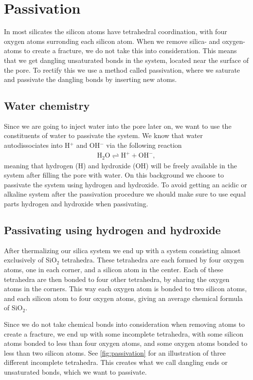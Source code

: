 \section{Passivation}
In most silicates the silicon atoms have tetrahedral coordination, with four oxygen atoms surronding each silicon atom. When we remove silica- and oxygen-atoms to create a fracture, we do not take this into consideration. This means that we get dangling unsaturated bonds in the system, located near the surface of the pore. To rectify this we use a method called passivation, where we saturate and passivate the dangling bonds by inserting new atoms. 

\subsection{Water chemistry}
Since we are going to inject water into the pore later on, we want to use the constituents of water to passivate the system. We know that water autodissociates into H$^{+}$ and OH$^{-}$ via the following reaction
\begin{align*}
    \text{H}_2\text{O} \rightleftharpoons \text{H}^{+} + \text{OH}^{-},
\end{align*}
meaning that hydrogen (H) and hydroxide (OH) will be freely available in the system after filling the pore with water. On this background we choose to passivate the system using hydrogen and hydroxide. To avoid getting an acidic or alkaline system after the passivation procedure we should make sure to use equal parts hydrogen and hydroxide when passivating.

\subsection{Passivating using hydrogen and hydroxide}
After thermalizing our silica system we end up with a system consisting almost exclusively of SiO$_2$ tetrahedra. These tetrahedra are each formed by four oxygen atoms, one in each corner, and a silicon atom in the center. Each of these tetrahedra are then bonded to four other tetrahedra, by sharing the oxygen atoms in the corners. This way each oxygen atom is bonded to two silicon atoms, and each silicon atom to four oxygen atoms, giving an average chemical formula of SiO$_2$. 

Since we do not take chemical bonds into consideration when removing atoms to create a fracture, we end up with some incomplete tetrahedra, with some silicon atoms bonded to less than four oxygen atoms, and some oxygen atoms bonded to less than two silicon atoms. See \cref{fig:passivation} for an illustration of three different incomplete tetrahedra. This creates what we call dangling ends or unsaturated bonds, which we want to passivate.

